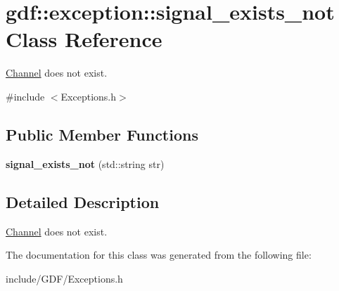 \hypertarget{classgdf_1_1exception_1_1signal__exists__not}{
\section{gdf::exception::signal\_\-exists\_\-not Class Reference}
\label{classgdf_1_1exception_1_1signal__exists__not}
}


\hyperlink{classgdf_1_1_channel}{Channel} does not exist.  




{\ttfamily \#include $<$Exceptions.h$>$}

\subsection*{Public Member Functions}
\begin{DoxyCompactItemize}
\item 
\hypertarget{classgdf_1_1exception_1_1signal__exists__not_a79235e74936b1ba16f85db1cd3539ab3}{
{\bfseries signal\_\-exists\_\-not} (std::string str)}
\label{classgdf_1_1exception_1_1signal__exists__not_a79235e74936b1ba16f85db1cd3539ab3}

\end{DoxyCompactItemize}


\subsection{Detailed Description}
\hyperlink{classgdf_1_1_channel}{Channel} does not exist. 

The documentation for this class was generated from the following file:\begin{DoxyCompactItemize}
\item 
include/GDF/Exceptions.h\end{DoxyCompactItemize}
